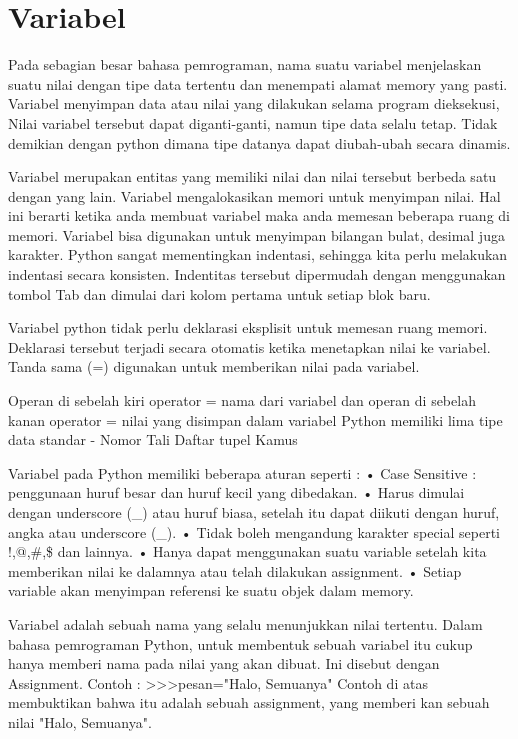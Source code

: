 
\section{Variabel}
Pada sebagian besar bahasa pemrograman, nama suatu variabel
menjelaskan suatu nilai dengan tipe data tertentu 
dan menempati alamat memory yang pasti.
Variabel menyimpan data atau nilai yang dilakukan selama program dieksekusi,
Nilai variabel tersebut dapat diganti-ganti, namun tipe data selalu tetap.
Tidak demikian dengan python dimana tipe datanya dapat diubah-ubah
secara dinamis\cite{suparno2013komputasi}.

Variabel merupakan entitas yang memiliki nilai dan nilai tersebut berbeda satu dengan yang lain. Variabel mengalokasikan memori untuk menyimpan nilai.
Hal ini berarti ketika anda membuat variabel maka anda memesan beberapa ruang di memori. 
Variabel bisa digunakan untuk menyimpan bilangan bulat, desimal juga karakter.
Python sangat mementingkan indentasi, sehingga kita perlu melakukan indentasi secara konsisten. 
Indentitas tersebut dipermudah dengan menggunakan tombol Tab dan dimulai dari kolom pertama untuk setiap blok baru.\cite{santoso2009bahasa}

Variabel python tidak perlu deklarasi eksplisit untuk memesan ruang memori. Deklarasi tersebut terjadi secara otomatis ketika menetapkan nilai ke variabel.
Tanda sama (=) digunakan untuk memberikan nilai pada variabel.

Operan di sebelah kiri operator =  nama dari variabel dan operan di sebelah kanan operator = nilai yang disimpan dalam variabel
Python memiliki lima tipe data standar -
Nomor
Tali
Daftar
tupel
Kamus

Variabel pada Python memiliki beberapa aturan seperti :
•	Case Sensitive : penggunaan huruf besar dan huruf kecil yang dibedakan.
•	Harus dimulai dengan underscore (_) atau huruf biasa, setelah itu dapat diikuti dengan huruf, angka atau underscore (_).
•	Tidak boleh mengandung karakter special seperti !,@,\#,\$ dan lainnya.
•	Hanya dapat menggunakan suatu variable setelah kita memberikan nilai ke dalamnya atau telah dilakukan assignment.
•	Setiap variable akan menyimpan referensi ke suatu objek dalam memory.\cite{santoso2009bahasa}

Variabel adalah sebuah nama yang selalu menunjukkan nilai tertentu. Dalam bahasa pemrograman Python, untuk membentuk sebuah variabel itu cukup hanya memberi nama pada nilai yang akan dibuat. Ini disebut dengan Assignment.
Contoh : 
>>>pesan="Halo, Semuanya"
Contoh di atas membuktikan bahwa itu adalah sebuah assignment, yang memberi kan sebuah nilai "Halo, Semuanya".\cite{Utami2004logika}

